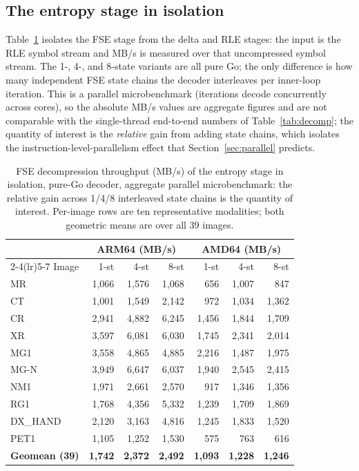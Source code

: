 \documentclass[journal]{IEEEtran}
\begin{document}
\subsection{The entropy stage in isolation}

Table~\ref{tab:fse-combined} isolates the FSE stage from the delta and RLE
stages: the input is the RLE symbol stream and MB/s is measured over that
uncompressed symbol stream. The 1-, 4-, and 8-state variants are all pure
Go; the only difference is how many independent FSE state chains the decoder
interleaves per inner-loop iteration. This is a parallel microbenchmark
(iterations decode concurrently across cores), so the absolute MB/s values
are aggregate figures and are not comparable with the single-thread
end-to-end numbers of Table~\ref{tab:decomp}; the quantity of interest is
the \emph{relative} gain from adding state chains, which isolates the
instruction-level-parallelism effect that Section~\ref{sec:parallel}
predicts.

\begin{table}[htbp]
\centering
\caption{FSE decompression throughput (MB/s) of the entropy stage in
isolation, pure-Go decoder, aggregate parallel microbenchmark: the relative
gain across 1/4/8 interleaved state chains is the quantity of interest.
Per-image rows are ten representative modalities; both geometric means are
over all 39 images.}
\label{tab:fse-combined}
\scriptsize
\setlength{\tabcolsep}{4pt}
\begin{tabular}{lrrrrrr}
\toprule
 & \multicolumn{3}{c}{ARM64 (MB/s)} & \multicolumn{3}{c}{AMD64 (MB/s)} \\
\cmidrule(lr){2-4}\cmidrule(lr){5-7}
Image & 1-st & 4-st & 8-st & 1-st & 4-st & 8-st \\
\midrule
MR       & 1,066 & 1,576 & 1,068 &   656 & 1,007 &   847 \\
CT       & 1,001 & 1,549 & 2,142 &   972 & 1,034 & 1,362 \\
CR       & 2,941 & 4,882 & 6,245 & 1,456 & 1,844 & 1,709 \\
XR       & 3,597 & 6,081 & 6,030 & 1,745 & 2,341 & 2,014 \\
MG1      & 3,558 & 4,865 & 4,885 & 2,216 & 1,487 & 1,975 \\
MG-N     & 3,949 & 6,647 & 6,037 & 1,940 & 2,545 & 2,415 \\
NM1      & 1,971 & 2,661 & 2,570 &   917 & 1,346 & 1,356 \\
RG1      & 1,768 & 4,356 & 5,332 & 1,239 & 1,709 & 1,869 \\
DX\_HAND & 2,120 & 3,163 & 4,816 & 1,245 & 1,833 & 1,520 \\
PET1     & 1,105 & 1,252 & 1,530 &   575 &   763 &   616 \\
\midrule
\textbf{Geomean (39)} & \textbf{1,742} & \textbf{2,372} & \textbf{2,492} &
\textbf{1,093} & \textbf{1,228} & \textbf{1,246} \\
\bottomrule
\end{tabular}
\end{table}
\end{document}
